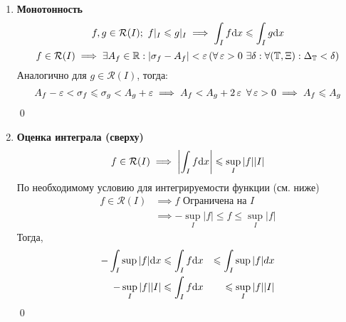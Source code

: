 \documentclass[a4paper]{article}
\begin{document}
\begin{enumerate}
\item \textbf{Монотонность}
\begin{equation*}
    f, g\in \mathcal{R}(I);\ f|_I\leqslant g|_I \implies \int_If\text{d}x \leqslant \int_Ig\text{d}x
\end{equation*}
\proof
    \begin{equation*}
        f\in \mathcal{R}(I) \implies \exists A_f\in \operatorname{\mathbb{R}} : |\sigma_f - A_f| < \operatorname{\varepsilon}\, (\forall \operatorname{\varepsilon} > 0\ \exists\delta: \forall(\operatorname{\mathbb{T}}, \Xi): \Delta_{\operatorname{\mathbb{T}}} < \delta)
    \end{equation*}
    Аналогично для $g\in \mathcal{R}(I)$, тогда:
    \begin{equation*}
    \begin{aligned}
        A_f - \operatorname{\varepsilon} < \sigma_f \leqslant \sigma_g < A_g + \operatorname{\varepsilon} \implies
        A_f < A_g + 2\operatorname{\varepsilon}\ \forall \operatorname{\varepsilon} > 0 \implies A_f \leqslant A_g
    \end{aligned}
    \end{equation*}
\qed
\item \textbf{Оценка интеграла (сверху)}
\begin{equation*}
    f\in \mathcal{R}(I) \implies \left|\int_If\text{d}x\right| \leqslant\sup\limits_{I}|f||I|
\end{equation*}
\proof
По необходимому условию для интегрируемости функции (см. ниже)
\begin{equation*}
    \begin{aligned}
        f\in \mathcal{R}(I) &\implies f \text{ Ограничена на } I\\
        &\implies -\sup_I|f| \leqslant f \leqslant \sup_I|f|
    \end{aligned}
\end{equation*}
Тогда,
\begin{equation*}
    \begin{aligned}
        -\int_I\sup|f|\text{d}x &\leqslant \int_If\text{d}x &\leqslant\int_I\sup|f|dx\\
        -\sup_I|f||I|&\leqslant \int_If\text{d}x&\leqslant \sup_I|f||I|
    \end{aligned}
\end{equation*}
\qed
\end{enumerate}
\end{document}
